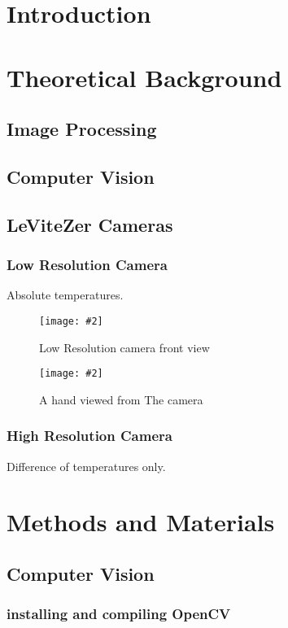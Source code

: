 \documentclass[hidelinks,11pt,a4paper,oneside,article]{memoir}
\newcommand{\putimage}[3][10] %
{
    \begin{figure}[h]
        \centering
        \captionsetup{justification=centering}
        \texttt{[image: \#2]}
        \caption{#3}
        \label{fig:#2}
    \end{figure}
}
\begin{document}
	\setcounter{page}{1} %
	\ClearWallPaper
	
	\sloppy %
	
	\chapter{Introduction}
	
    
    \clearpage	
	\chapter{Theoretical Background}
    \section{Image Processing}
    \section{Computer Vision}
    \section{LeViteZer Cameras}
    \subsection{Low Resolution Camera}
    Absolute temperatures.
    \putimage{low-resolution}{Low Resolution camera front view}
    \putimage{hand}{A hand viewed from The camera}
    \subsection{High Resolution Camera}
    Difference of temperatures only.
    
    \clearpage
	\chapter{Methods and Materials}
    \section{Computer Vision}
    \subsection{installing and compiling OpenCV}
\end{document}
